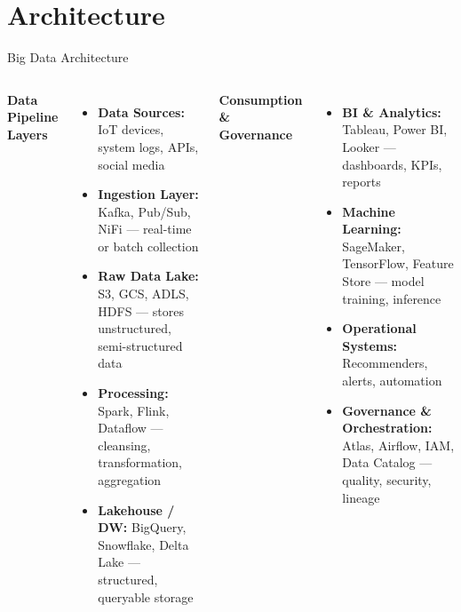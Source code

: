 \documentclass[aspectratio=169, table]{beamer}
\begin{document}
		
	
\section{Architecture}
\begin{frame}[fragile]{Big Data Architecture}
	\vspace{6pt}
	\footnotesize
	\begin{columns}[T,onlytextwidth]
		\textbf{Data Pipeline Layers}
		\begin{itemize}
			\item \textbf{Data Sources:} IoT devices, system logs, APIs, social media
			\item \textbf{Ingestion Layer:} Kafka, Pub/Sub, NiFi — real-time or batch collection
			\item \textbf{Raw Data Lake:} S3, GCS, ADLS, HDFS — stores unstructured, semi-structured data
			\item \textbf{Processing:} Spark, Flink, Dataflow — cleansing, transformation, aggregation
			\item \textbf{Lakehouse / DW:} BigQuery, Snowflake, Delta Lake — structured, queryable storage
		\end{itemize}
		
		\textbf{Consumption \& Governance}
		\begin{itemize}
			\item \textbf{BI \& Analytics:} Tableau, Power BI, Looker — dashboards, KPIs, reports
			\item \textbf{Machine Learning:} SageMaker, TensorFlow, Feature Store — model training, inference
			\item \textbf{Operational Systems:} Recommenders, alerts, automation
			\item \textbf{Governance \& Orchestration:} Atlas, Airflow, IAM, Data Catalog — quality, security, lineage
		\end{itemize}
	\end{columns}
\end{frame}


	
	
\end{document}
